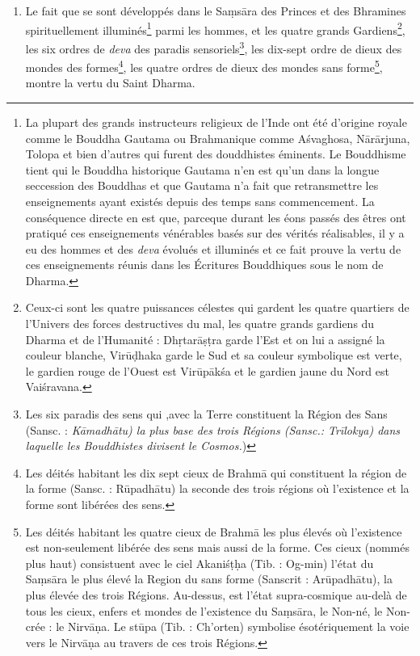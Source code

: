 \documentclass[10pt]{book}
\begin{document}
\begin{enumerate}[1.-]
\item Le fait que se sont développés dans le Saṃsāra des Princes et des Bhramines spirituellement illuminés\footnote{La plupart des grands instructeurs religieux de l'Inde ont été d'origine royale comme le Bouddha Gautama ou Brahmanique comme Aśvaghosa, Nārārjuna, Tolopa et bien d'autres qui furent des douddhistes éminents. Le Bouddhisme tient qui le Bouddha historique Gautama n'en est qu'un dans la longue seccession des Bouddhas et que Gautama n'a fait que retransmettre les enseignements ayant existés depuis des temps sans commencement. La conséquence directe en est que, parceque durant les éons passés des êtres ont pratiqué ces enseignements vénérables basés sur des vérités réalisables, il y a eu des hommes et des \textit{deva} évolués et illuminés et ce fait prouve la vertu de ces enseignements réunis dans les Écritures Bouddhiques sous le nom de Dharma.} parmi les hommes, et les quatre grands Gardiens\footnote{Ceux-ci sont les quatre puissances célestes qui gardent les quatre quartiers de l'Univers des forces destructives du mal, les quatre grands gardiens du Dharma et de l'Humanité : Dhṛtarāṣṭra garde l'Est et on lui a assigné la couleur blanche, Virūḍhaka garde le Sud et sa couleur symbolique est verte, le gardien rouge de l'Ouest est Virūpākśa et le gardien jaune du Nord est Vaiśravana.}, les six ordres de \textit{deva} des paradis sensoriels\footnote{Les six paradis des sens qui ,avec la Terre constituent la Région des Sans (Sansc. : \textit{Kāmadhātu) la plus base des trois Régions (Sansc.: Trīlokya) dans laquelle les Bouddhistes divisent le Cosmos.})}, les dix-sept ordre de dieux des mondes des formes\footnote{Les déités habitant les dix sept cieux de Brahmā qui constituent la région de la forme (Sansc. : Rūpadhātu) la seconde des trois régions où l'existence et la forme sont libérées des sens.}, les quatre ordres de dieux des mondes sans forme\footnote{Les déités habitant les quatre cieux de Brahmā les plus élevés où l'existence est non-seulement libérée des sens mais aussi de la forme. Ces cieux (nommés plus haut) consistuent avec le ciel Akaniśṭḥa (Tib. : Og-min) l'état du Saṃsāra le plus élevé la Region du sans forme (Sanscrit : Arūpadhātu), la plus élevée des trois Régions. Au-dessus, est l'état supra-cosmique au-delà de tous les cieux, enfers et mondes de l'existence du Saṃsāra, le Non-né, le Non-crée : le Nirvāṇa. Le stūpa (Tib. : Ch'orten) symbolise ésotériquement la voie vers le Nirvāṇa au travers de ces trois Régions.}, montre la vertu du Saint Dharma.

\end{enumerate}
\end{document}
